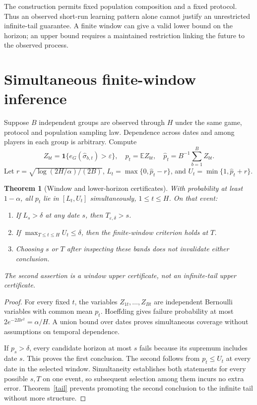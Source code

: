 \documentclass[11pt]{article}
\newtheorem{theorem}{Theorem}
\theoremstyle{remark}
\newcommand{\E}{\mathbb E}
\newcommand{\Ind}{\mathbf1}
\begin{document}
The construction permits fixed population composition and a fixed protocol. Thus an observed short-run learning pattern alone cannot justify an unrestricted infinite-tail guarantee. A finite window can give a valid lower bound on the horizon; an upper bound requires a maintained restriction linking the future to the observed process.

\section{Simultaneous finite-window inference}
Suppose $B$ independent groups are observed through $H$ under the same game, protocol and population sampling law. Dependence across dates and among players in each group is arbitrary. Compute
\[
 Z_{bt}=\Ind\{e_G(\widehat\sigma_{b,t})>\varepsilon\},
 \quad p_t=\E Z_{bt},\quad
 \widehat p_t=B^{-1}\sum_{b=1}^B Z_{bt}.
\]
Let $r=\sqrt{\log(2H/\alpha)/(2B)}$, $L_t=\max\{0,\widehat p_t-r\}$, and $U_t=\min\{1,\widehat p_t+r\}$.

\begin{theorem}[Window and lower-horizon certificates]\label{window}
With probability at least $1-\alpha$, all $p_t$ lie in $[L_t,U_t]$ simultaneously, $1\leq t\leq H$. On that event:
\begin{enumerate}
\item If $L_s>\delta$ at any date $s$, then $T_{\varepsilon,\delta}>s$.
\item If $\max_{T\leq t\leq H}U_t\leq\delta$, then the finite-window criterion holds at $T$.
\item Choosing $s$ or $T$ after inspecting these bands does not invalidate either conclusion.
\end{enumerate}
The second assertion is a window upper certificate, not an infinite-tail upper certificate.
\end{theorem}
\begin{proof}
For every fixed $t$, the variables $Z_{1t},\ldots,Z_{Bt}$ are independent Bernoulli variables with common mean $p_t$. Hoeffding gives failure probability at most $2e^{-2Br^2}=\alpha/H$. A union bound over dates proves simultaneous coverage without assumptions on temporal dependence.

If $p_s>\delta$, every candidate horizon at most $s$ fails because its supremum includes date $s$. This proves the first conclusion. The second follows from $p_t\leq U_t$ at every date in the selected window. Simultaneity establishes both statements for every possible $s,T$ on one event, so subsequent selection among them incurs no extra error. Theorem~\ref{tail} prevents promoting the second conclusion to the infinite tail without more structure.
\end{proof}
\end{document}

